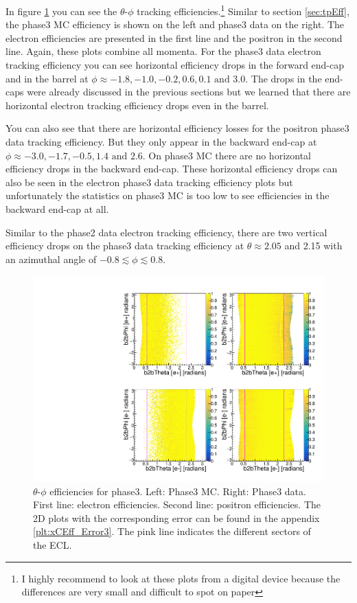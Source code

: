 \documentclass[a4paper,11pt,twosided,final,german,openbib,pdftex,listof=totoc,bibliography=totoc]{scrbook}
\begin{document}
In figure \ref{plt:xCEff3} you can see the $\theta$-$\phi$ tracking efficiencies.\footnote{I highly recommend to look at these plots from a digital device because the differences are very small and difficult to spot on paper}
Similar to section \ref{sec:tpEff}, the phase3 MC efficiency is shown on the left and phase3 data on the right. The electron efficiencies are presented in the first line and the positron in the second line. Again, these plots combine all momenta. For the phase3 data electron tracking efficiency you can see horizontal efficiency drops in the forward end-cap and in the barrel at $\phi \approx -1.8, -1.0, -0.2, 0.6, 0.1 \textrm{ and }3.0$. 
The drops in the end-caps were already discussed in the previous sections but we learned that there are horizontal electron tracking efficiency drops even in the barrel. 

You can also see that there are horizontal efficiency losses for the positron phase3 data tracking efficiency. But they only appear in the backward end-cap at $\phi \approx -3.0, -1.7, -0.5, 1.4 \textrm{ and } 2.6$. On phase3 MC there are no horizontal efficiency drops in the backward end-cap. These horizontal efficiency drops can also be seen in the electron phase3 data tracking efficiency plots but unfortunately the statistics on phase3 MC is too low to see efficiencies in the backward end-cap at all.

Similar to the phase2 data electron tracking efficiency, there are two vertical efficiency drops on the phase3 data tracking efficiency at $\theta \approx 2.05$ and 2.15 with an azimuthal angle of $-0.8 \lesssim \phi \lesssim 0.8$.


\begin{figure}[!htbp]
	\centering
	\includegraphics[width=\textwidth]{Plots/master3/xCEffTP_MCDataP3.pdf}
	\caption[$\theta$-$\phi$ Efficiency Plots Phase3]{$\theta$-$\phi$ efficiencies for phase3. Left: Phase3 MC. Right: Phase3 data. First line: electron efficiencies. Second line: positron efficiencies. The 2D plots with the corresponding error can be found in the appendix \ref{plt:xCEff_Error3}. The pink line indicates the different sectors of the ECL.}
	\label{plt:xCEff3}
\end{figure}
\end{document}
